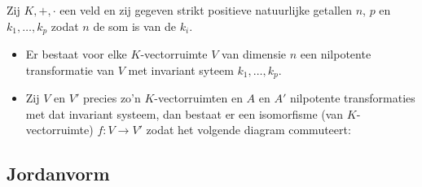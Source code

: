 \documentclass[main.tex]{subfiles}
\begin{document}
\begin{pr}
  Zij $K,+,\cdot$ een veld en zij gegeven strikt positieve natuurlijke getallen $n$, $p$ en $k_{1}, \dotsc, k_{p}$ zodat $n$ de som is van de $k_{i}$.
  \begin{itemize}
  \item Er bestaat voor elke $K$-vectorruimte $V$ van dimensie $n$ een nilpotente transformatie van $V$ met invariant syteem $k_{1}, \dotsc, k_{p}$.
  \item Zij $V$ en $V'$ precies zo'n $K$-vectorruimten en $A$ en $A'$ nilpotente transformaties met dat invariant systeem, dan bestaat er een isomorfisme (van $K$-vectorruimte) $f: V\rightarrow V'$ zodat het volgende diagram commuteert:
    \begin{figure}[H]
      \centering
    \end{figure}
  \end{itemize}
\end{pr}


\subsection{Jordanvorm}
\label{sec:jordanvorm}
\end{document}
